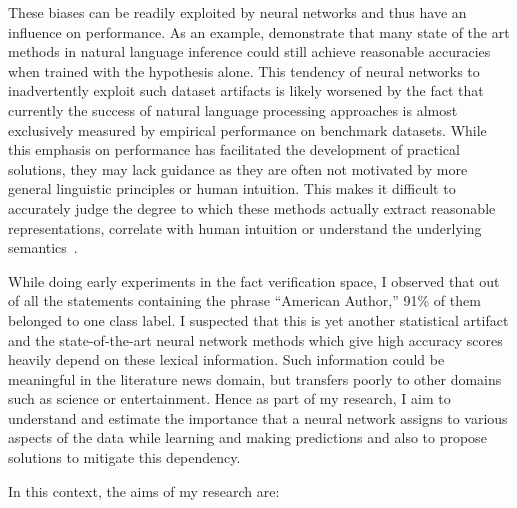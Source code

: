 \documentclass{article}
\begin{document}
These biases can be readily exploited by neural networks and thus have an influence on performance.  As an example, \citep*{gururangan2018annotation} demonstrate that many state of the art methods in natural language inference could still achieve reasonable accuracies when trained with the hypothesis alone. This tendency of neural networks to inadvertently exploit such dataset artifacts is likely worsened by the fact that currently the success of natural language processing approaches is almost exclusively measured by empirical performance on benchmark datasets. While this emphasis on performance has facilitated the development of practical solutions, they may lack guidance as they are often not motivated by more general linguistic principles or human intuition. This makes it difficult to accurately judge the degree to which these methods actually extract reasonable representations, correlate with  human intuition or understand the underlying semantics~\citep*{dagan2013recognizing}.



While doing  early experiments in the fact verification space, I observed that out of all the statements containing the phrase ``American Author,'' 91\% of them belonged to one class label. I suspected that this is yet another statistical artifact and the state-of-the-art neural network methods which give high accuracy scores heavily depend on these lexical information. Such information could be meaningful in the literature news domain, but transfers poorly to other domains such as science or entertainment.  Hence as part of my research, I aim to understand and estimate the importance that a neural network assigns to various aspects of the data while learning and making predictions and also to propose solutions to mitigate this dependency.


In this context, the aims of my research are:
\end{document}
